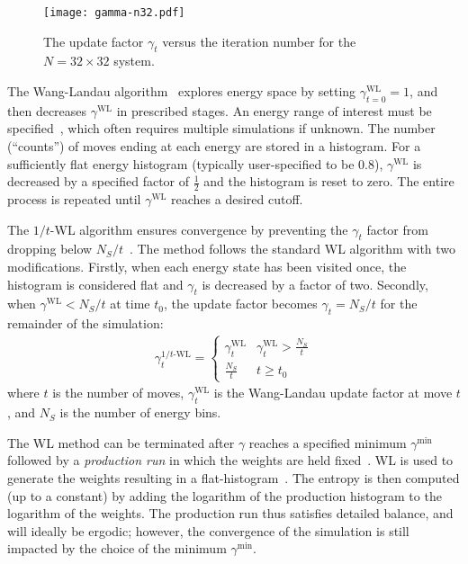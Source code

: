 \begin{figure}
\texttt{[image: gamma-n32.pdf]}
  \caption{
  The update factor $\gamma_t$ versus the iteration number for the $N=32 \times 32$
  system.}
  \label{fig:N32-gamma}
\end{figure}

The Wang-Landau algorithm~\cite{wang2001efficient,wang2001determining,
landau2014guide} explores energy space by setting
$\gamma_{t=0}^{\text{WL}}=1$, and then decreases $\gamma^{\text{WL}}$ in prescribed stages. An energy range of
interest must be specified~\cite{wang2001efficient, schulz2003avoiding,yan2003fast}, which often requires multiple simulations if unknown.
%
The number (``counts'') of moves ending at each energy are stored in a
histogram.  For a sufficiently flat energy histogram (typically user-specified to be 0.8), $\gamma^{\text{WL}}$ is decreased by a specified factor of $\frac12$ and the histogram is reset to zero. The entire process is repeated until $\gamma^{\text{WL}}$ reaches a desired cutoff.

The $1/t$-WL algorithm ensures convergence by preventing the $\gamma_t$ factor
from dropping below $N_S/t$~\cite{belardinelli2008analysis,
schneider2017convergence}. The method follows the standard WL algorithm with two
modifications.  Firstly, when each energy state has been visited once, the histogram is considered flat and $\gamma_t$ is
decreased by a factor of two. Secondly, when
$\gamma^{\text{WL}} < N_S/t$ at time $t_0$, the update factor becomes
$\gamma_t = N_S/t$ for the remainder of the simulation:
\begin{align}
  \gamma_t^{1/t\text{-WL}} = \begin{cases}
     \gamma^{\text{WL}}_t & \gamma^{\text{WL}}_t > \frac{N_S}{t} \\
     \frac{N_S}{t} & t \ge t_0
 \end{cases}
\end{align}
where $t$ is the number of moves, $\gamma^{\text{WL}}_t$ is the Wang-Landau update factor
at move $t$, and $N_S$ is the number of energy bins.

The WL method can be terminated after $\gamma$ reaches a specified
minimum $\gamma^{\min}$ followed by a \emph{production run} in which the
weights are held fixed~\cite{gross2018massively}. WL is used to
generate the weights resulting in a
flat-histogram~\cite{janke2017generalized}.  The entropy is then
computed (up to a constant) by adding the logarithm of the production
histogram to the logarithm of the weights.  The production run thus
satisfies detailed balance, and will ideally be ergodic; however, the
convergence of the simulation is still impacted by the choice of the
minimum $\gamma^{\min}$.

